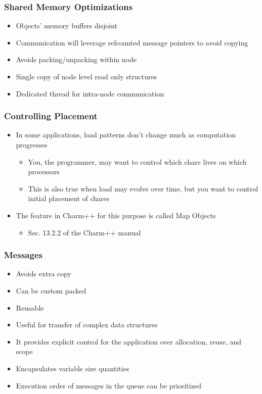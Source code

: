 \begin{frame}[fragile]
  \frametitle{Shared Memory Optimizations}
  \begin{itemize}
    \item Objects' memory buffers disjoint
    \item Communication will leverage refcounted message pointers to avoid copying
    \item Avoids packing/unpacking within node
    \item Single copy of node level read only structures
    \item Dedicated thread for intra-node communication
  \end{itemize}
\end{frame}

\begin{frame}[fragile]
  \frametitle{Controlling Placement}
  \begin{itemize}
    \item In some applications, load patterns don’t change much as computation progresses
    \begin{itemize}
      \item You, the programmer, may want to control which chare lives on which processors
      \item This is also true when  load may evolve over time, but you want to control initial placement of chares
    \end{itemize}
    \item The feature in Charm++ for this purpose is called Map Objects
    \begin{itemize}
      \item Sec. 13.2.2 of the Charm++ manual
    \end{itemize}
  \end{itemize}
\end{frame}

\begin{frame}[fragile]
  \frametitle{Messages}
  \begin{itemize}
    \item Avoids extra copy
    \item Can be custom packed
    \item Reusable
    \item Useful for transfer of complex data structures
    \item It provides explicit control for the application over allocation, reuse, and scope
    \item Encapsulates variable size quantities
    \item Execution order of messages in the queue can be prioritized
  \end{itemize}
\end{frame}

